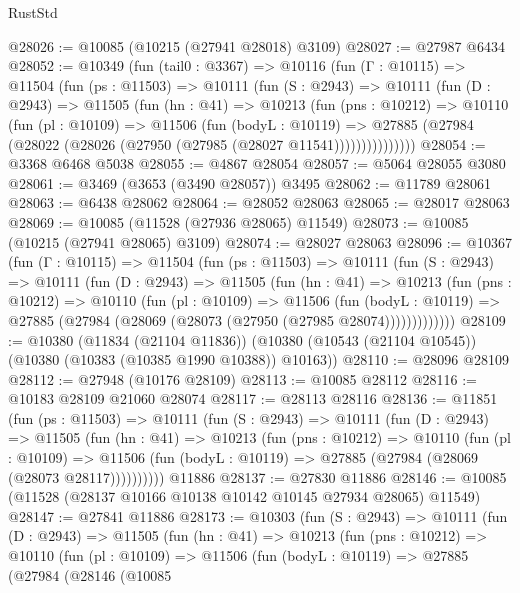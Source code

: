 \begin{lexlean}{RustStd}
\begin{coremodule}
@28026 := @10085 (@10215 (@27941 @28018) @3109)
@28027 := @27987 @6434
@28052 := @10349
    (fun (tail0 : @3367) =>
    @10116
      (fun (Γ : @10115) =>
      @11504
        (fun (ps : @11503) =>
        @10111
          (fun (S : @2943) =>
          @10111
            (fun (D : @2943) =>
            @11505
              (fun (hn : @41) =>
              @10213
                (fun (pns : @10212) =>
                @10110
                  (fun (pl : @10109) =>
                  @11506
                    (fun (bodyL : @10119) =>
                    @27885 (@27984 (@28022 (@28026 (@27950 (@27985 (@28027 @11541)))))))))))))))
@28054 := @3368 @6468 @5038
@28055 := @4867 @28054
@28057 := @5064 @28055 @3080
@28061 := @3469 (@3653 (@3490 @28057)) @3495
@28062 := @11789 @28061
@28063 := @6438 @28062
@28064 := @28052 @28063
@28065 := @28017 @28063
@28069 := @10085 (@11528 (@27936 @28065) @11549)
@28073 := @10085 (@10215 (@27941 @28065) @3109)
@28074 := @28027 @28063
@28096 := @10367
    (fun (Γ : @10115) =>
    @11504
      (fun (ps : @11503) =>
      @10111
        (fun (S : @2943) =>
        @10111
          (fun (D : @2943) =>
          @11505
            (fun (hn : @41) =>
            @10213
              (fun (pns : @10212) =>
              @10110
                (fun (pl : @10109) =>
                @11506
                  (fun (bodyL : @10119) =>
                  @27885 (@27984 (@28069 (@28073 (@27950 (@27985 @28074)))))))))))))
@28109 := @10380
    (@11834 (@21104 @11836))
    (@10380 (@10543 (@21104 @10545)) (@10380 (@10383 (@10385 @1990 @10388)) @10163))
@28110 := @28096 @28109
@28112 := @27948 (@10176 @28109)
@28113 := @10085 @28112
@28116 := @10183 @28109 @21060 @28074
@28117 := @28113 @28116
@28136 := @11851
    (fun (ps : @11503) =>
    @10111
      (fun (S : @2943) =>
      @10111
        (fun (D : @2943) =>
        @11505
          (fun (hn : @41) =>
          @10213
            (fun (pns : @10212) =>
            @10110
              (fun (pl : @10109) =>
              @11506 (fun (bodyL : @10119) => @27885 (@27984 (@28069 (@28073 @28117))))))))))
    @11886
@28137 := @27830 @11886
@28146 := @10085 (@11528 (@28137 @10166 @10138 @10142 @10145 @27934 @28065) @11549)
@28147 := @27841 @11886
@28173 := @10303
    (fun (S : @2943) =>
    @10111
      (fun (D : @2943) =>
      @11505
        (fun (hn : @41) =>
        @10213
          (fun (pns : @10212) =>
          @10110
            (fun (pl : @10109) =>
            @11506
              (fun (bodyL : @10119) =>
              @27885
                (@27984
                  (@28146
                    (@10085

\end{coremodule}
\end{lexlean}
